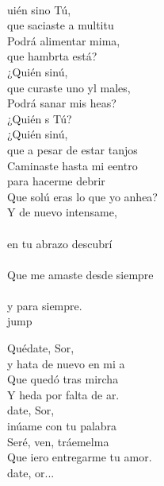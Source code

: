 \begin{cancion}
	\jump\\
	uién sino Tú,\\
	que saciaste a multitu\\
	Podrá alimentar mima, \\
	que hambrta está?\\
	¿Quién sinú, \\
	que curaste uno yl males,\\
	Podrá sanar mis heas?\\
	¿Quién s Tú?\\
	¿Quién sinú,\\
	que a pesar de estar tanjos\\
	Caminaste hasta mi eentro\\
	para hacerme debrir\\
	Que solú eras lo que yo anhea?\\
	Y de nuevo intensame,\\
	\jump\\
en tu abrazo descubrí\\
	\jump\\
Que me amaste desde siempre\\
	\jump\\
y para siempre.\\jump\\
	\begin{chorus}%
	Quédate, Sor,\\
	y hata de nuevo en mi a\\
	Que  quedó tras mircha\\
	Y heda por falta de ar.\\
	date, Sor, \\
	inúame con tu palabra\\
	Seré, ven, tráemelma \\
	Que iero entregarme tu amor.\\
	date, or...          \\
	\end{chorus}%
	\jump\\
\end{cancion}%
